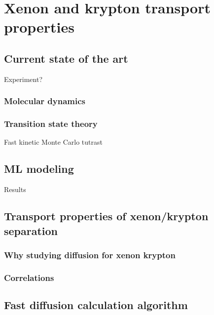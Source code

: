 \documentclass[main]{subfiles}
\begin{document}
\chapter{Xenon and krypton transport properties}
\vspace*{-1\baselineskip}

\section{Current state of the art}

Experiment? 

\subsection{Molecular dynamics}

\subsection{Transition state theory}



Fast kinetic Monte Carlo
tutrast\cite{Mace_2019}

\section{ML modeling}

Results

\section{Transport properties of xenon/krypton separation}

\subsection{Why studying diffusion for xenon krypton}


\subsection{Correlations}

\section{Fast diffusion calculation algorithm}
\end{document}
